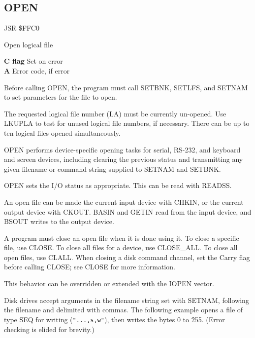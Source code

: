 
\newpage
\subsection{OPEN}
\label{KERNAL Jump Table!OPEN}
\begin{description}[leftmargin=2cm,style=nextline]
    \item [Address:] JSR \$FFC0
    \item [Description:] Open logical file
    \item [Outputs:]
        \textbf{C flag} Set on error \\
        \textbf{A} Error code, if error
    \item [Remarks:]
        Before calling OPEN, the program must call SETBNK, SETLFS, and SETNAM to set parameters for the file to open.

        The requested logical file number (LA) must be currently un-opened. Use LKUPLA to test for unused logical file numbers, if necessary. There can be up to ten logical files opened simultaneously.

        OPEN performs device-specific opening tasks for serial, RS-232, and keyboard and screen devices, including clearing the previous status and transmitting any given filename or command string supplied to SETNAM and SETBNK.

        OPEN sets the I/O status as appropriate. This can be read with READSS.

        An open file can be made the current input device with CHKIN, or the current output device with CKOUT. BASIN and GETIN read from the input device, and BSOUT writes to the output device.

        A program must close an open file when it is done using it. To close a specific file, use CLOSE. To close all files for a device, use CLOSE\_ALL. To close all open files, use CLALL. When closing a disk command channel, set the Carry flag before calling CLOSE; see CLOSE for more information.

        This behavior can be overridden or extended with the IOPEN vector.
    \item [Examples:]
        Disk drives accept arguments in the filename string set with SETNAM, following the filename and delimited with commas. The following example opens a file of type SEQ for writing (\texttt{"...,s,w"}), then writes the bytes 0 to 255. (Error checking is elided for brevity.)


\end{description}

